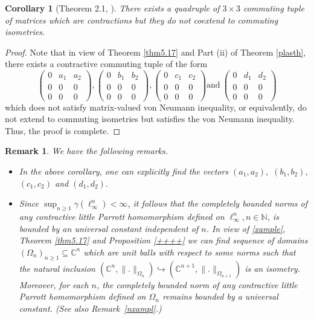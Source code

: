\documentclass[a4paper,oneside,11pt, reqno]{amsart}
\numberwithin{equation}{section}
\newtheorem{remark}[theorem]{Remark}
\newtheorem{corollary}[theorem]{Corollary}
\theoremstyle{plain}
\begin{document}
\begin{corollary}[Theorem 2.1, \cite{Davidchoi}]\label{choicor} 
There exists a quadruple of $3\times 3$ commuting tuple of matrices which are contractions but they do not coextend to commuting isometries.
\end{corollary}
\begin{proof}
    Note that in view of Theorem \ref{thm5.17} and Part (ii) of Theorem \ref{plasth}, there exists a contractive commuting tuple of the form 
    \[\begin{pmatrix}
 0 & a_1 & a_2 \\
 0 & 0 & 0 \\
 0 & 0 & 0
\end{pmatrix}, \begin{pmatrix}
 0 & b_1 & b_2 \\
 0 & 0 & 0 \\
 0 & 0 & 0
\end{pmatrix}, \begin{pmatrix}
 0 & c_1 & c_2 \\
 0 & 0 & 0 \\
 0 & 0 & 0
\end{pmatrix} \text{and}\ \begin{pmatrix}
 0 & d_1 & d_2 \\
 0 & 0 & 0 \\
 0 & 0 & 0
\end{pmatrix}\] which does not satisfy matrix-valued von Neumann inequality, or equivalently, do not extend to commuting isometries but satisfies the von Neumann inequality. 
Thus, the proof is complete. 
\end{proof}
\begin{remark}
We have the following remarks.
\begin{itemize}
    \item[(i)] In the above corollary, one can explicitly find the vectors $(a_1,a_2),$ $(b_1,b_2),$ $(c_1,c_2)$ and $(d_1,d_2).$   
    \item[(ii)] Since $\sup_{n\geq 1}\gamma(\ell_\infty^n)<\infty$, it follows that the completely bounded norms of any contractive little Parrott homomorphism defined on $\ell_\infty^n, n\in \mathbb{N}$, is bounded by an universal constant independent of $n$. In view of \ref{xample}, Theorem \ref{thm5.17} and Proposition \ref{++++} we can find sequence of domains $(\Omega_n)_{n\geq 1}\subseteq\mathbb{C}^n$ which are unit balls with respect to some norms such that the natural inclusion $(\mathbb{C}^n,\|.\|_{\Omega_n})\hookrightarrow (\mathbb{C}^{n+1},\|.\|_{\Omega_{n+1}})$ is an isometry. Moreover, for each \(n\), the completely bounded norm of any contractive little Parrott homomorphism defined on \(\Omega_n\) remains bounded by a universal constant. (See also Remark~\ref{nxampl}.)
\end{itemize}
   
\end{remark}
\end{document}

